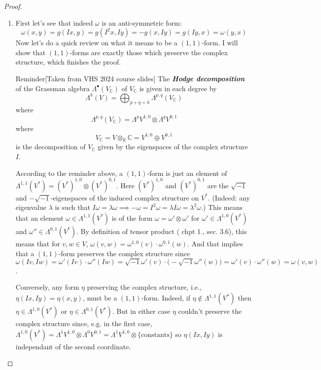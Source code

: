 \begin{proof}\leavevmode
	\begin{enumerate}[label=\alph*.]
		\item First let's see that indeed $\omega$ is an anti-symmetric form:
			 \[\omega(x,y)=g(Ix,y)=g(I^2x,Iy)=-g(x,Iy)=g(Iy,x)=\omega(y,x)\]Now let's do a quick review on what it means to be a $(1,1)$-form. I will show that $(1,1)$-forms are exactly those which preserve the complex structure, which finishes the proof.
	\begin{thing3}{Reminder}[Taken from VHS 2024 course slides]\leavevmode
	The \textit{\textbf{Hodge decomposition}} of the Grassman algebra $\Lambda^{\bullet}(V_\mathbb{C})$ of $V_{\mathbb{C}}$ is given in each degree by
	 \[\Lambda^{k}(V)=\bigoplus_{p+q=k} \Lambda^{p,q}(V_\mathbb{C}) \]
	 where
	 \[\Lambda^{p,q}(V_\mathbb{C})=\Lambda^{p}V^{1,0}\otimes \Lambda^{q}V^{0,1}\]
	 where
	 \[V_\mathbb{C}=V\otimes_\mathbb{R}\mathbb{C}=V^{1,0} \oplus V^{0,1}\]
	 is the decomposition of $V_\mathbb{C}$ given by the eigenspaces of the complex structure $I$.
\end{thing3}
According to the reminder above, a $(1,1)$-form is just an element of $\Lambda^{1,1}(V^*)=(V^* )^{1,0}\otimes(V^* )^{0,1}$. Here $(V^*)^{1,0}$ and $(V^* )^{0,1}$ are the $\sqrt{-1} $ and $-\sqrt{-1}$-eigenspaces of the induced complex structure on $V^*$. (Indeed: any eigenvalue $\lambda$ is such that $I\omega=\lambda\omega\implies -\omega=I^2\omega=\lambda I\omega=\lambda^2\omega$.) This means that an element $\omega\in\Lambda^{1,1}(V^*)$ is of the form $\omega=\omega' \otimes \omega'$ for $\omega'\in\Lambda^{1,0}(V^*)$ and $\omega''\in\Lambda^{0,1}(V^*)$. By definition of tensor product (\cite{tu-smooth} chpt 1., sec. 3.6), this means that for $v,w \in V$, $\omega(v,w)=\omega^{1,0}(v) \cdot \omega^{0,1}(w)$. And that implies that a $(1,1)$-form preserves the complex structure since $\omega(Iv,Iw)=\omega'(Iv)\cdot \omega''(Iw)=\sqrt{-1}\omega'(v)\cdot\big(-\sqrt{-1}\omega''(w)\big)=\omega'(v)\cdot \omega''(w)=\omega(v,w)$.

Conversely, any form $\eta$ preserving the complex structure, i.e., $\eta(Ix,Iy)=\eta(x,y)$, must be a $(1,1)$-form. Indeed, if  $\eta \not\in\Lambda^{1,1}(V^*)$ then $\eta\in\Lambda^{1,0}(V^*)$ or $\eta\in\Lambda^{0,1}(V^*)$. But in either case $\eta$ couldn't preserve the complex structure since, e.g. in the first case, $\Lambda^{1,0}(V^*)=\Lambda^{1}V^{1,0} \otimes \Lambda^{0}V^{0,1}= \Lambda^{1}V^{1,0} \otimes \{\text{constants} \}$ so $\eta(Ix,Iy)$ is independant of the second coordinate.


\end{enumerate}
\end{proof}
